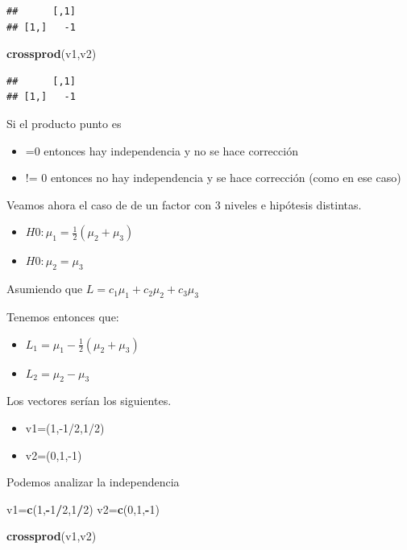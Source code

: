 \documentclass[
]{article}
\newenvironment{Shaded}{\begin{snugshade}}{\end{snugshade}}
\newcommand{\DecValTok}[1]{\textcolor[rgb]{0.00,0.00,0.81}{#1}}
\newcommand{\FunctionTok}[1]{\textcolor[rgb]{0.13,0.29,0.53}{\textbf{#1}}}
\newcommand{\NormalTok}[1]{#1}
\newcommand{\OtherTok}[1]{\textcolor[rgb]{0.56,0.35,0.01}{#1}}
\newcommand{\SpecialCharTok}[1]{\textcolor[rgb]{0.81,0.36,0.00}{\textbf{#1}}}
\providecommand{\tightlist}{%
  \setlength{\itemsep}{0pt}\setlength{\parskip}{0pt}}
\begin{document}
\begin{verbatim}
##      [,1]
## [1,]   -1
\end{verbatim}

\begin{Shaded}
\begin{Highlighting}[]
\FunctionTok{crossprod}\NormalTok{(v1,v2)}
\end{Highlighting}
\end{Shaded}

\begin{verbatim}
##      [,1]
## [1,]   -1
\end{verbatim}

Si el producto punto es

\begin{itemize}
\item
  =0 entonces hay independencia y no se hace corrección
\item
  != 0 entonces no hay independencia y se hace corrección (como en ese
  caso)
\end{itemize}

Veamos ahora el caso de de un factor con 3 niveles e hipótesis
distintas.

\begin{itemize}
\item
  \(H0: \mu_1=\frac{1}{2}(\mu_2+\mu_3)\)
\item
  \(H0: \mu_2=\mu_3\)
\end{itemize}

Asumiendo que \(L=c_1\mu_1+c_2\mu_2+c_3\mu_3\)

Tenemos entonces que:

\begin{itemize}
\tightlist
\item
  \(L_1 = \mu_1-\frac{1}{2}(\mu_2+\mu_3)\)
\item
  \(L_2 = \mu_2-\mu_3\)
\end{itemize}

Los vectores serían los siguientes.

\begin{itemize}
\tightlist
\item
  v1=(1,-1/2,1/2)
\item
  v2=(0,1,-1)
\end{itemize}

Podemos analizar la independencia

\begin{Shaded}
\begin{Highlighting}[]
\NormalTok{v1}\OtherTok{=}\FunctionTok{c}\NormalTok{(}\DecValTok{1}\NormalTok{,}\SpecialCharTok{{-}}\DecValTok{1}\SpecialCharTok{/}\DecValTok{2}\NormalTok{,}\DecValTok{1}\SpecialCharTok{/}\DecValTok{2}\NormalTok{)}
\NormalTok{v2}\OtherTok{=}\FunctionTok{c}\NormalTok{(}\DecValTok{0}\NormalTok{,}\DecValTok{1}\NormalTok{,}\SpecialCharTok{{-}}\DecValTok{1}\NormalTok{)}

\FunctionTok{crossprod}\NormalTok{(v1,v2)}
\end{Highlighting}
\end{Shaded}
\end{document}
